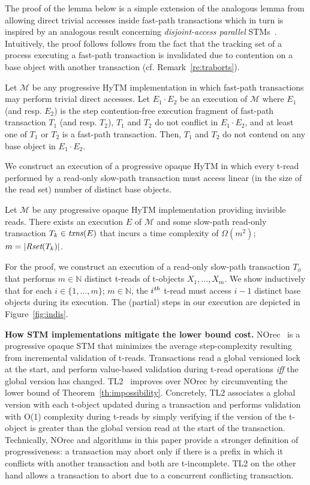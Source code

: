 The proof of the lemma below is a simple extension of the analogous lemma from \cite{hytm14disc}
allowing direct trivial accesses inside fast-path transactions which in turn is inspired by an analogous result concerning \emph{disjoint-access parallel} STMs~\cite{AHM09}. 
Intuitively, the proof follows follows from the fact that
the tracking set of a process executing a fast-path transaction is invalidated due to contention on a base
object with another transaction (cf. Remark~\ref{re:traborts}).
%
\begin{lemma}
\label{lm:hytm}
%
Let $\mathcal{M}$ be any progressive HyTM implementation in which fast-path transactions may perform trivial
direct accesses.
Let $E_1 \cdot E_2$ be an execution of $\mathcal{M}$ where
$E_1$ (and resp. $E_2$) is the step contention-free
execution fragment of fast-path transaction $T_1$ (and resp. $T_2$),
$T_1$ and $T_2$ do not conflict in $E_1 \cdot E_2$, and
at least one of $T_1$ or $T_2$ is a fast-path transaction. 
Then, $T_1$ and $T_2$ do not contend on any base object in $E_1 \cdot E_2$.
\end{lemma}
%
We construct an execution of a progressive opaque HyTM in which every t-read performed by a read-only slow-path transaction
must access linear (in the size of the read set) number of distinct base objects.
%
\begin{theorem}
\label{th:impossibility}
Let $\mathcal{M}$ be any progressive opaque HyTM implementation providing invisible reads.
There exists an execution $E$ of $\mathcal{M}$ and some slow-path read-only transaction $T_k \in \ms{txns}(E)$
that incurs a time complexity of $\Omega (m^2)$; $m=|\textit{Rset}(T_k)|$.
\end{theorem}
%
For the proof, we construct an execution of a read-only slow-path transaction $T_{\phi}$ that performs $m \in \mathbb{N}$
distinct t-reads of t-objects $X_1,\ldots , X_m$. We show inductively that for each 
$i\in \{1,\ldots , m\}$; $m \in \mathbb{N}$, the $i^{\ms{th}}$ t-read must access $i-1$ distinct base objects
during its execution. The (partial) steps in our execution are depicted in Figure~\ref{fig:indis}.

%
%
\vspace{1mm}\noindent\textbf{How STM implementations mitigate the lower bound cost.}
NOrec~\cite{norec} is a progressive opaque STM that minimizes the average step-complexity resulting from incremental 
validation of t-reads. Transactions read a global versioned lock at the start, and perform value-based validation
during t-read operations \emph{iff} the global version has changed.
TL2~\cite{DSS06} improves over NOrec by circumventing the lower bound
of Theorem~\ref{th:impossibility}. Concretely, TL2 associates a global version with each t-object updated during
a transaction and performs validation with O(1) complexity during t-reads by simply verifying if the version
of the t-object is greater than the global version read at the start of the transaction. Technically,
NOrec and algorithms in this paper provide a stronger definition of progressiveness: a transaction may abort
only if there is a prefix in which it conflicts with another transaction and both are t-incomplete. TL2 on the other hand allows
a transaction to abort due to a concurrent conflicting transaction.

